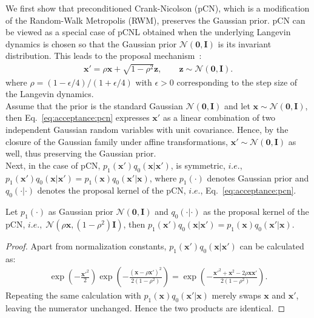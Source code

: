 We first show that preconditioned Crank-Nicolson (pCN), which is a modification of the Random-Walk Metropolis (RWM), preserves the Gaussian prior.
pCN can be viewed as a special case of pCNL obtained when the underlying Langevin dynamics is chosen so that the Gaussian prior $\mathcal{N}(\mathbf{0}, \mathbf{I})$ is its invariant distribution.
This leads to the proposal mechanism~\cite{Cotter_2013pcnl, Beskos_2017geometricMCMC}:
\begin{align}
    \label{eq:acceptance:pcn}
    \mathbf{x}'=\rho \mathbf{x}+\sqrt{1-\rho^2}\mathbf{z}, \qquad \mathbf{z}\sim \mathcal{N}(\mathbf{0}, \mathbf{I}).
\end{align}
where $\rho=(1-\epsilon/4)/(1+\epsilon/4)$ with $\epsilon>0$ corresponding to the step size of the Langevin dynamics.\\
Assume that the prior is the standard Gaussian $\mathcal{N}(\mathbf{0}, \mathbf{I})$ and let $\mathbf{x}\sim \mathcal{N}(\mathbf{0}, \mathbf{I})$, then Eq.~\ref{eq:acceptance:pcn} expresses $\mathbf{x}'$ as a linear combination of two independent Gaussian random variables with unit covariance. Hence, by the closure of the Gaussian family under affine transformations, $\mathbf{x}'\sim \mathcal{N}(\mathbf{0}, \mathbf{I})$ as well, thus preserving the Gaussian prior.\\
Next, in the case of pCN, $p_1(\mathbf{x}')q_0(\mathbf{x}|\mathbf{x}')$, is symmetric, $i.e.$, $p_1(\mathbf{x}')q_0(\mathbf{x}|\mathbf{x}')=p_1(\mathbf{x})q_0(\mathbf{x}'|\mathbf{x})$, where $p_1(\cdot)$ denotes Gaussian prior and $q_0(\cdot|\cdot)$ denotes the proposal kernel of the pCN, $i.e.$, Eq.~\ref{eq:acceptance:pcn}.
\begin{remark}
    \label{remark:acceptance:pcn}
    Let $p_1(\cdot)$ as Gaussian prior $\mathcal{N}(\mathbf{0}, \mathbf{I})$ and $q_0(\cdot|\cdot)$ as the proposal kernel of the pCN, $i.e., \;\mathcal{N}(\rho\mathbf{x}, (1-\rho^2)\mathbf{I})$, then $p_1(\mathbf{x}')q_0(\mathbf{x}|\mathbf{x}')=p_1(\mathbf{x})q_0(\mathbf{x}'|\mathbf{x})$.
\end{remark}
\begin{proof}
    Apart from normalization constants, $p_1(\mathbf{x}')q_0(\mathbf{x}|\mathbf{x}')$ can be calculated as:
    \begin{align}
        \nonumber
        \exp\left(-\frac{\mathbf{x}'^2}{2} \right)\exp\left( -\frac{(\mathbf{x}-\rho \mathbf{x}')^2}{2(1-\rho^2)} \right)=\exp \left(-\frac{\mathbf{x}'^2+\mathbf{x}^2-2\rho \mathbf{x}\mathbf{x}'}{2(1-\rho^2)} \right).
    \end{align}
    Repeating the same calculation with $p_1(\mathbf{x})q_0(\mathbf{x}'|\mathbf{x})$ merely swaps $\mathbf{x}$ and $\mathbf{x}'$, leaving the numerator unchanged. Hence the two products are identical.
\end{proof}
